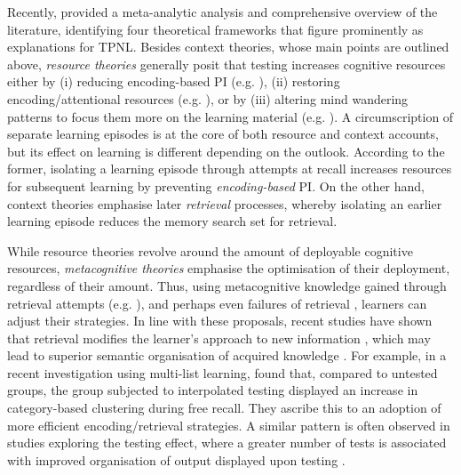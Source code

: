 \documentclass[../main.tex]{subfiles}
\begin{document}
Recently, \cite{chanRetrievalPotentiatesNew2018} provided a meta-analytic 
analysis and comprehensive overview of the literature, identifying four 
theoretical frameworks that figure prominently as explanations for TPNL. 
Besides context theories, whose main points are outlined above, 
\textit{resource theories} generally posit that testing increases cognitive 
resources either by (i) reducing encoding-based PI (e.g. 
\citealp{wahlheimTestingCanCounteract2015, 
	weinsteinTestingProtectsProactive2011, szpunarTestingStudyInsulates2008, 
	nunesTestingImprovesTrue2012}), (ii) restoring encoding/attentional 
resources (e.g. \citealp{pastotterRetrievalLearningFacilitates2011}), or by 
(iii) altering mind wandering patterns to focus them more on the learning 
material (e.g. \citealp{jingInterpolatedTestingInfluences2016, 
	szpunarInterpolatedMemoryTests2013,szpunarMindWanderingEducation2013}).
A circumscription of separate learning episodes is at the core of both 
resource and context accounts, but its effect on learning is different 
depending on the outlook. According to the former, isolating a learning 
episode through attempts at recall increases resources for subsequent 
learning by preventing \textit{encoding-based} PI. On the other hand, 
context theories emphasise later \textit{retrieval} processes, whereby 
isolating an earlier learning episode reduces the memory search set for 
retrieval. 

While resource theories revolve around the amount of deployable cognitive 
resources, \textit{metacognitive theories} emphasise the optimisation of 
their deployment, regardless of their amount. Thus, using metacognitive 
knowledge gained through retrieval attempts (e.g. 
\citealp{choTestingEnhancesBoth2017, 
	chanTestingPotentiatesNew2018}), and perhaps even failures of retrieval 
\citep{bahrickImportanceRetrievalFailures2005}, learners can adjust their 
strategies. In line with these proposals, recent studies have shown that 
retrieval modifies the learner's approach to new information 
\citep{choTestingEnhancesBoth2017, 
	soderstromTestingFacilitatesRegulation2014}, which may lead to superior 
semantic organisation of acquired knowledge 
\citep{chanTestingPotentiatesNew2018, 
jingInterpolatedTestingInfluences2016}. For example, in a recent 
investigation using multi-list learning, 
\cite{chanTestingPotentiatesNew2018} found that, compared to untested 
groups, the group subjected to interpolated testing displayed an increase in 
category-based clustering during free recall. They ascribe this to an 
adoption of more efficient encoding/retrieval strategies. A similar pattern 
is often observed in studies exploring the testing effect, where a greater 
number of tests is associated with improved organisation of output displayed 
upon testing \citep{zarombTestingEffectFree2010, 
karpickeRetrievalBasedLearningActive2012}.
\end{document}

